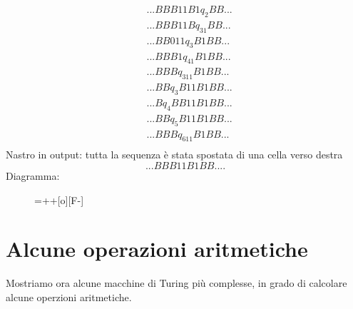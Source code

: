 \begin{itemize}
\begin{eqnarray*}
&...BBB11B1q_2BB...\\
&...BBB11Bq_31BB...\\
&...BB011q_3B1BB...\\
&...BBB1q_41B1BB...\\
&...BBBq_311B1BB...\\
&...BBq_3B11B1BB...\\
&...Bq_4BB11B1BB...\\
&...BBq_5B11B1BB...\\
&...BBBq_611B1BB...\\
\end{eqnarray*}
Nastro in output: tutta la sequenza \`e stata spostata di una cella
verso destra $$...BBB11B1BB....$$ Diagramma:
\begin{figure}[hbtp!]
\hspace{3 cm} \entrymodifiers={++[o][F-]} \\
\end{figure}

\end{itemize}

\section{Alcune operazioni aritmetiche}
Mostriamo ora alcune macchine di Turing pi\`u complesse, in grado di
calcolare alcune operzioni aritmetiche.\\

